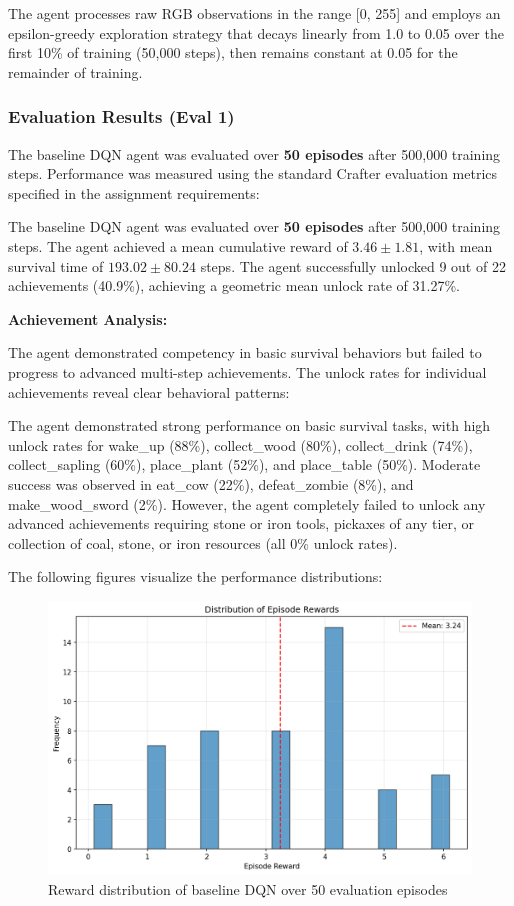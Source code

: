 \documentclass[twocolumn]{article}
\begin{document}
The agent processes raw RGB observations in the range [0, 255] and employs an epsilon-greedy exploration strategy that decays linearly from 1.0 to 0.05 over the first 10\% of training (50,000 steps), then remains constant at 0.05 for the remainder of training.

\subsubsection*{Evaluation Results (Eval 1)}

The baseline DQN agent was evaluated over \textbf{50 episodes} after 500,000 training steps. Performance was measured using the standard Crafter evaluation metrics specified in the assignment requirements:

The baseline DQN agent was evaluated over \textbf{50 episodes} after 500,000 training steps. The agent achieved a mean cumulative reward of $3.46 \pm 1.81$, with mean survival time of $193.02 \pm 80.24$ steps. The agent successfully unlocked 9 out of 22 achievements (40.9\%), achieving a geometric mean unlock rate of 31.27\%.

\textbf{Achievement Analysis:}

The agent demonstrated competency in basic survival behaviors but failed to progress to advanced multi-step achievements. The unlock rates for individual achievements reveal clear behavioral patterns:

The agent demonstrated strong performance on basic survival tasks, with high unlock rates for wake\_up (88\%), collect\_wood (80\%), collect\_drink (74\%), collect\_sapling (60\%), place\_plant (52\%), and place\_table (50\%). Moderate success was observed in eat\_cow (22\%), defeat\_zombie (8\%), and make\_wood\_sword (2\%). However, the agent completely failed to unlock any advanced achievements requiring stone or iron tools, pickaxes of any tier, or collection of coal, stone, or iron resources (all 0\% unlock rates).

The following figures visualize the performance distributions:

\begin{figure}[H]
    \centering
    \includegraphics[width=0.8\linewidth]{images/DQNbaseline1_reward.png}
    \caption{Reward distribution of baseline DQN over 50 evaluation episodes}
    \label{fig:dqn_baseline_reward}
\end{figure}
\end{document}
